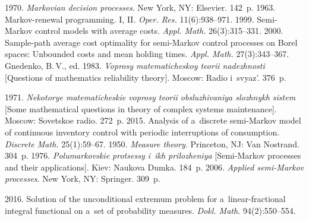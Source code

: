   \begin{multicols}{2}

\renewcommand{\bibname}{\protect\rmfamily References}

{\small\frenchspacing
 {%
 \begin{thebibliography}{99}
 1970. \textit{Markovian decision processes}. New York, NY: Elsevier. 142~p.
 1963. Markov-renewal programming. I, II. \textit{Oper. Res.} 11(6):938--971.
 1999. Semi-Markov control models with average costs. \textit{Appl. Math.} 26(3):315--331.
 2000. Sample-path average cost optimality for semi-Markov control processes on Borel spaces: 
 Unbounded costs and mean holding times. \textit{Appl. Math.} 27(3):343--367.
Gnedenko, B.\,V., ed. 1983. 
\textit{Voprosy matematicheskoy teorii nadezhnosti}
 [Questions of mathematics reliability theory]. Moscow: Radio i~svyaz'. 376~p.

 \columnbreak
 
 1971. \textit{Nekotorye matematicheskie voprosy teorii obsluzhivaniya slozhnykh sistem}
  [Some mathematical questions in theory of complex systems maintenance]. Moscow: Sovetskoe radio. 272~p.
 2015. Analysis of a~discrete semi-Markov model of continuous inventory control with periodic 
 interruptions of consumption. \textit{Discrete Math.} 25(1):59--67.
 1950. \textit{Measure theory}. Princeton, NJ:
Van Nostrand. 304~p.
 1976. \textit{Polumarkovskie protsessy i~ikh prilozheniya} [Semi-Markov processes and their applications]. 
 Kiev: Naukova Dumka. 184~p.
 2006. \textit{Applied semi-Markov processes}. New York, NY: Springer. 309~p.

\pagebreak

 2016. Solution of the unconditional extremum problem for a~linear-fractional integral functional on 
 a~set of probability measures. \textit{Dokl. Math.} 94(2):550--554.
 
 

\end{thebibliography}}}
\end{multicols}
